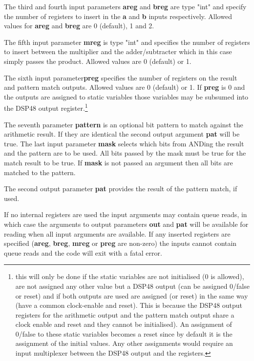             The third and fourth input parameters {\bf areg} and {\bf breg}
            are type "int" and specify the number of registers to insert
            in the {\bf a} and {\bf b} inputs respectively. Allowed
            values for {\bf areg} and {\bf breg} are 0 (default), 1 and 2.

            The fifth input parameter {\bf mreg} is type "int" and specifies the
            number of registers to insert between the multiplier and the
            adder/subtracter which in this case simply passes the product.
            Allowed values are 0 (default) or 1.

            The sixth input parameter{\bf preg} specifies the number of
            registers on the result and pattern match outputs. Allowed values
            are 0 (default) or 1. If {\bf preg} is 0 and the outputs are
            assigned to static variables those variables may be subsumed into
            the DSP48 output register.\footnote{this will only be done if the
            static variables are not initialised (0 is allowed), are not
            assigned any other value but a DSP48 output (can be assigned 0/false
            or reset) and if both outputs are used are assigned (or reset) in
            the same way (have a common clock-enable and reset). This is because
            the DSP48 output registers for the arithmetic output and
            the pattern match output share a clock enable and reset and they
            cannot be initialised). An assignment of 0/false to these static
            variables becomes a reset since by default it is the assignment of
            the initial values. Any other assignments would require an input
            multiplexer between the DSP48 output and the registers.}

            The seventh parameter {\bf pattern} is an optional bit pattern to
            match against the arithmetic result. If they are identical the
            second output argument {\bf pat} will be true. The last input
            parameter {\bf mask} selects which bits from ANDing the result and
            the pattern are to be used. All bits passed by the mask must be true
            for the match result to be true. If {\bf mask} is not passed an
            argument then all bits are matched to the pattern.

            The second output parameter {\bf pat} provides the result of the
            pattern match, if used.

            If no internal registers are used the input arguments may contain
            queue reads, in which case the arguments to output parameters {\bf
            out} and {\bf pat} will be available for reading when all input
            arguments are available. If any inserted registers are specified
            ({\bf areg}, {\bf breg}, {\bf mreg} or {\bf preg} are non-zero) the
            inputs cannot contain queue reads and the code will exit with a fatal
            error.




